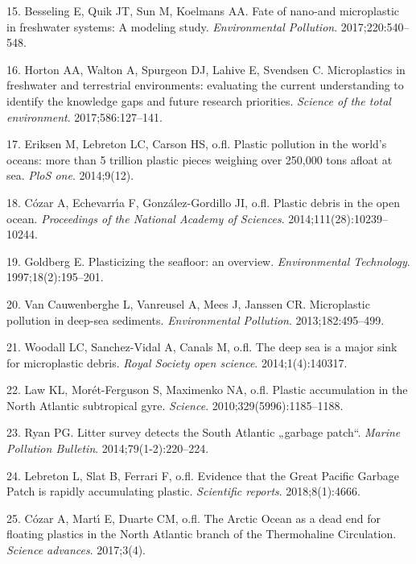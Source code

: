 \documentclass[icelandic,]{book}
\begin{document}
\leavevmode\hypertarget{ref-besseling2017fate}{}%
15. Besseling E, Quik JT, Sun M, Koelmans AA. Fate of nano-and microplastic in freshwater systems: A modeling study. \emph{Environmental Pollution}. 2017;220:540--548.

\leavevmode\hypertarget{ref-horton2017microplastics}{}%
16. Horton AA, Walton A, Spurgeon DJ, Lahive E, Svendsen C. Microplastics in freshwater and terrestrial environments: evaluating the current understanding to identify the knowledge gaps and future research priorities. \emph{Science of the total environment}. 2017;586:127--141.

\leavevmode\hypertarget{ref-eriksen2014plastic}{}%
17. Eriksen M, Lebreton LC, Carson HS, o.fl. Plastic pollution in the world's oceans: more than 5 trillion plastic pieces weighing over 250,000 tons afloat at sea. \emph{PloS one}. 2014;9(12).

\leavevmode\hypertarget{ref-cozar2014plastic}{}%
18. Cózar A, Echevarrı́a F, González-Gordillo JI, o.fl. Plastic debris in the open ocean. \emph{Proceedings of the National Academy of Sciences}. 2014;111(28):10239--10244.

\leavevmode\hypertarget{ref-goldberg1997plasticizing}{}%
19. Goldberg E. Plasticizing the seafloor: an overview. \emph{Environmental Technology}. 1997;18(2):195--201.

\leavevmode\hypertarget{ref-van2013microplastic}{}%
20. Van Cauwenberghe L, Vanreusel A, Mees J, Janssen CR. Microplastic pollution in deep-sea sediments. \emph{Environmental Pollution}. 2013;182:495--499.

\leavevmode\hypertarget{ref-woodall2014deep}{}%
21. Woodall LC, Sanchez-Vidal A, Canals M, o.fl. The deep sea is a major sink for microplastic debris. \emph{Royal Society open science}. 2014;1(4):140317.

\leavevmode\hypertarget{ref-law2010plastic}{}%
22. Law KL, Morét-Ferguson S, Maximenko NA, o.fl. Plastic accumulation in the North Atlantic subtropical gyre. \emph{Science}. 2010;329(5996):1185--1188.

\leavevmode\hypertarget{ref-ryan2014litter}{}%
23. Ryan PG. Litter survey detects the South Atlantic „garbage patch``. \emph{Marine Pollution Bulletin}. 2014;79(1-2):220--224.

\leavevmode\hypertarget{ref-lebreton2018evidence}{}%
24. Lebreton L, Slat B, Ferrari F, o.fl. Evidence that the Great Pacific Garbage Patch is rapidly accumulating plastic. \emph{Scientific reports}. 2018;8(1):4666.

\leavevmode\hypertarget{ref-cozar2017arctic}{}%
25. Cózar A, Martı́ E, Duarte CM, o.fl. The Arctic Ocean as a dead end for floating plastics in the North Atlantic branch of the Thermohaline Circulation. \emph{Science advances}. 2017;3(4).
\end{document}
